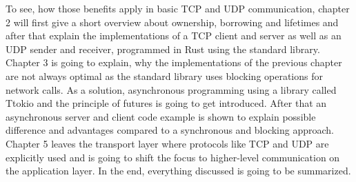 To see, how those benefits apply in basic TCP and UDP communication, chapter 2 will first give a short overview about
ownership, borrowing and lifetimes and after that explain the implementations of a TCP client and server as well as an
UDP sender and receiver, programmed in Rust using the standard library. Chapter 3 is going to explain, why the
implementations of the previous chapter are not always optimal as the standard library uses blocking operations for
network calls. As a solution, asynchronous programming using a library called Ttokio and the principle of futures is
going to get introduced. After that an asynchronous server and client code example is shown to explain possible
difference and advantages compared to a synchronous and blocking approach. Chapter 5 leaves the transport layer where
protocols like TCP and UDP are explicitly used and is going to shift the focus to higher-level communication on the
application layer. In the end, everything discussed is going to be summarized.
